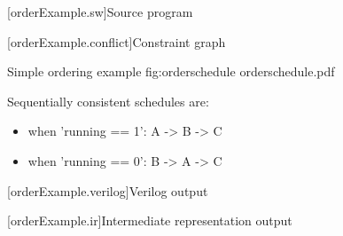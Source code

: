 
[orderExample.sw]{Source program}



[orderExample.conflict]{Constraint graph}

\begin{importgraphic}
{Simple ordering example}
{fig:orderschedule}
{orderschedule.pdf}
\end{importgraphic}

Sequentially consistent schedules are:
\begin{itemize}[noitemsep,topsep=0pt]
\item when 'running == 1': A -> B -> C
\item when 'running == 0': B -> A -> C
\end{itemize}

[orderExample.verilog]{Verilog output}



[orderExample.ir]{Intermediate representation output}


